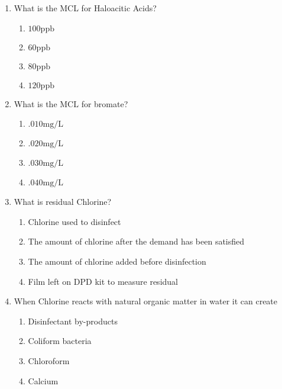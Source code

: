 \begin{enumerate}
\item  What is the MCL for Haloacitic Acids?\\
\begin{enumerate}
\item $100 \mathrm{ppb}$\\
\item $60 \mathrm{ppb}$\\
\item $80 \mathrm{ppb}$\\
\item $120 \mathrm{ppb}$
\end{enumerate}

\item What is the $\mathrm{MCL}$ for bromate?\\
\begin{enumerate}
\item $.010 \mathrm{mg} / \mathrm{L}$\\
\item $.020 \mathrm{mg} / \mathrm{L}$\\
\item $.030 \mathrm{mg} / \mathrm{L}$\\
\item $.040 \mathrm{mg} / \mathrm{L}$
\end{enumerate}

\item What is residual Chlorine?\\
\begin{enumerate}
\item Chlorine used to disinfect\\
\item The amount of chlorine after the demand has been satisfied\\
\item The amount of chlorine added before disinfection\\
\item Film left on DPD kit to measure residual
\end{enumerate}

\item  When Chlorine reacts with natural organic matter in water it can create\\
\begin{enumerate}
\item Disinfectant by-products\\
\item Coliform bacteria\\
\item Chloroform\\
\item Calcium
\end{enumerate}


\end{enumerate}
